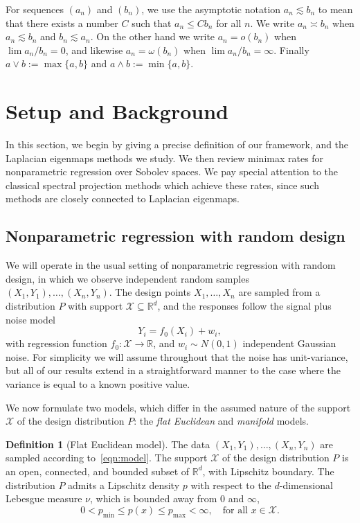 \documentclass{article}
\newcommand{\Reals}{\mathbb{R}}
\newcommand{\1}{\mathbf{1}}
\newcommand{\Rd}{\Reals^d}
\newcommand{\mc}[1]{\mathcal{#1}}
\theoremstyle{alden}
\theoremstyle{aldenthm}
\theoremstyle{definition}
\newtheorem{definition}{Definition}[section]
\theoremstyle{remark}
\begin{document}
For sequences $(a_n)$ and $(b_n)$, we use the asymptotic notation $a_n \lesssim b_n$ to mean that there exists a number $C$ such that $a_n \leq C b_n$ for all $n$. We write $a_n \asymp b_n$ when $a_n \lesssim b_n$ and $b_n \lesssim a_n$. On the other hand we write $a_n = o(b_n)$ when $\lim a_n/b_n = 0$, and likewise $a_n = \omega(b_n)$ when $\lim a_n/b_n = \infty$. Finally $a \vee b := \max\{a,b\}$ and $a \wedge b := \min\{a,b\}$.

\section{Setup and Background}
\label{sec:setup_main_results}

In this section, we begin by giving a precise definition of our framework, and the Laplacian eigenmaps methods we study. We then review minimax rates for nonparametric regression over Sobolev spaces. We pay special attention to the classical spectral projection methods which achieve these rates, since such methods are closely connected to Laplacian eigenmaps.

\subsection{Nonparametric regression with random design}
\label{sec:regression_laplacian_eigenmaps}

We will operate in the usual setting of nonparametric regression with random design, in which we observe independent random samples $(X_1,Y_1),\ldots,(X_n,Y_n)$. The design points $X_1,\ldots,X_n$ are sampled from a distribution $P$ with support $\mc{X} \subseteq \Rd$, and the responses follow the signal plus noise model
\begin{equation}
\label{eqn:model}
Y_i = f_0(X_i) + w_i,
\end{equation}
with regression function $f_0: \mc{X} \to \Reals$, and $w_i \sim N(0,1)$ independent Gaussian noise. For simplicity we will assume throughout that the noise has unit-variance, but all of our results extend in a straightforward manner to the case where the variance is equal to a known positive value. 

We now formulate two models, which differ in the assumed nature of the support $\mc{X}$ of the design distribution $P$: the \emph{flat Euclidean} and \emph{manifold} models.

\begin{definition}[Flat Euclidean model]
	\label{def:model_flat_euclidean}
	The data $(X_1,Y_1),\ldots,(X_n,Y_n)$ are sampled according to~\eqref{eqn:model}. The support $\mc{X}$ of the design distribution $P$ is an open, connected, and bounded subset of $\Rd$, with Lipschitz boundary. The distribution $P$ admits a Lipschitz density $p$ with respect to the $d$-dimensional Lebesgue measure $\nu$, which is bounded away from $0$ and $\infty$,
	\begin{equation*}
	0 < p_{\min} \leq p(x) \leq p_{\max} < \infty, \quad \textrm{for all $x \in \mc{X}$.}
	\end{equation*}
\end{definition}
\end{document}
